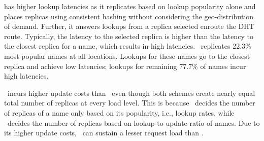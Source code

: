 {\em{\codons}}  has higher lookup latencies as it replicates based on lookup popularity alone and places replicas using consistent hashing without considering the geo-distribution of demand. Further, it answers lookups from a replica selected enroute the DHT route. Typically, the latency to the selected replica  is higher than the latency to the closest replica for a name, which results in high latencies.  \codons\ replicates 22.3\%   most popular names at all locations. Lookups for these names go to the closest replica and achieve low latencies; lookups for remaining 77.7\% of names incur high latencies.

\codons\  incurs higher update costs than \auspice\   even though both schemes create nearly equal total number of replicas at every load level. This is because \codons\ decides the number of replicas of a name only based on its popularity, i.e., lookup rates, while \auspice\ decides the number of replicas based on lookup-to-update ratio of names. Due to its higher update costs, \codons\  can sustain a lesser request load than \auspice.







